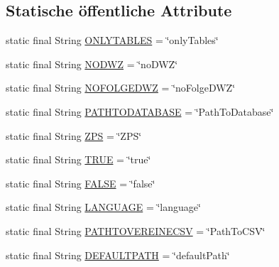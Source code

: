 \subsection*{Statische öffentliche Attribute}
\begin{DoxyCompactItemize}
\item 
static final String \hyperlink{classde_1_1turnierverwaltung_1_1control_1_1_properties_control_a4161a812ba748cff1e027117816346f7}{O\+N\+L\+Y\+T\+A\+B\+L\+ES} = \char`\"{}only\+Tables\char`\"{}
\item 
static final String \hyperlink{classde_1_1turnierverwaltung_1_1control_1_1_properties_control_a466f648c061d04037737b7c7a457a0db}{N\+O\+D\+WZ} = \char`\"{}no\+D\+WZ\char`\"{}
\item 
static final String \hyperlink{classde_1_1turnierverwaltung_1_1control_1_1_properties_control_a022fa15eea61b4cb12e7baaa546e0399}{N\+O\+F\+O\+L\+G\+E\+D\+WZ} = \char`\"{}no\+Folge\+D\+WZ\char`\"{}
\item 
static final String \hyperlink{classde_1_1turnierverwaltung_1_1control_1_1_properties_control_a705eaec26fdd7b6d6b59c3f9b81ed9d8}{P\+A\+T\+H\+T\+O\+D\+A\+T\+A\+B\+A\+SE} = \char`\"{}Path\+To\+Database\char`\"{}
\item 
static final String \hyperlink{classde_1_1turnierverwaltung_1_1control_1_1_properties_control_aa8808b693c7a05ea88bf60f5b2f6697e}{Z\+PS} = \char`\"{}Z\+PS\char`\"{}
\item 
static final String \hyperlink{classde_1_1turnierverwaltung_1_1control_1_1_properties_control_ac7170ed78e03fa2b1374bfb19ddc2005}{T\+R\+UE} = \char`\"{}true\char`\"{}
\item 
static final String \hyperlink{classde_1_1turnierverwaltung_1_1control_1_1_properties_control_ab85719e1a79d2a55d75307d25d25a7f2}{F\+A\+L\+SE} = \char`\"{}false\char`\"{}
\item 
static final String \hyperlink{classde_1_1turnierverwaltung_1_1control_1_1_properties_control_af201cc20be74c0745f1d384cc70a78a8}{L\+A\+N\+G\+U\+A\+GE} = \char`\"{}language\char`\"{}
\item 
static final String \hyperlink{classde_1_1turnierverwaltung_1_1control_1_1_properties_control_a10a96821aeec2f1d5b43102b7ec6101a}{P\+A\+T\+H\+T\+O\+V\+E\+R\+E\+I\+N\+E\+C\+SV} = \char`\"{}Path\+To\+C\+SV\char`\"{}
\item 
static final String \hyperlink{classde_1_1turnierverwaltung_1_1control_1_1_properties_control_a40b9634abc9985bf8dd4afb3691a8ae8}{D\+E\+F\+A\+U\+L\+T\+P\+A\+TH} = \char`\"{}default\+Path\char`\"{}

\end{DoxyCompactItemize}
